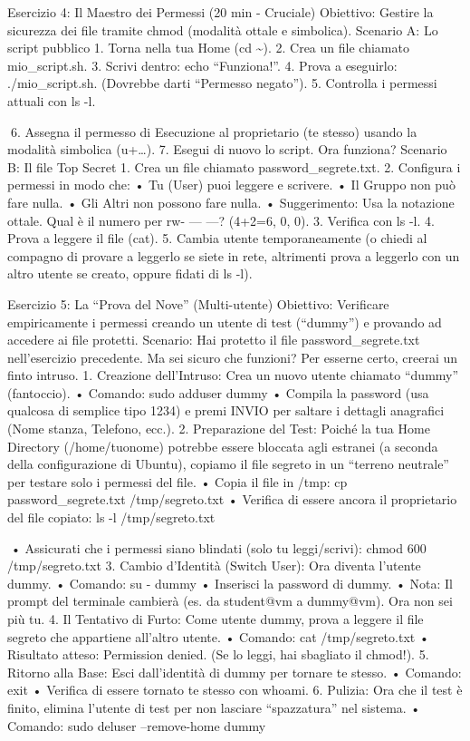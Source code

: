 \documentclass[11pt,a4paper]{article}
\begin{document}
Esercizio 4: Il Maestro dei Permessi (20 min - Cruciale) Obiettivo:
Gestire la sicurezza dei file tramite chmod (modalità ottale e
simbolica). Scenario A: Lo script pubblico 1. Torna nella tua Home (cd
\textasciitilde). 2. Crea un file chiamato mio\_script.sh. 3. Scrivi
dentro: echo ``Funziona!''. 4. Prova a eseguirlo: ./mio\_script.sh.
(Dovrebbe darti ``Permesso negato''). 5. Controlla i permessi attuali
con ls -l.

6. Assegna il permesso di Esecuzione al proprietario (te stesso) usando
la modalità simbolica (u+\ldots). 7. Esegui di nuovo lo script. Ora
funziona? Scenario B: Il file Top Secret 1. Crea un file chiamato
password\_segrete.txt. 2. Configura i permessi in modo che: • Tu (User)
puoi leggere e scrivere. • Il Gruppo non può fare nulla. • Gli Altri non
possono fare nulla. • Suggerimento: Usa la notazione ottale. Qual è il
numero per rw- --- ---? (4+2=6, 0, 0). 3. Verifica con ls -l. 4. Prova a
leggere il file (cat). 5. Cambia utente temporaneamente (o chiedi al
compagno di provare a leggerlo se siete in rete, altrimenti prova a
leggerlo con un altro utente se creato, oppure fidati di ls -l).

Esercizio 5: La ``Prova del Nove'' (Multi-utente) Obiettivo: Verificare
empiricamente i permessi creando un utente di test (``dummy'') e
provando ad accedere ai file protetti. Scenario: Hai protetto il file
password\_segrete.txt nell'esercizio precedente. Ma sei sicuro che
funzioni? Per esserne certo, creerai un finto intruso. 1. Creazione
dell'Intruso: Crea un nuovo utente chiamato ``dummy'' (fantoccio). •
Comando: sudo adduser dummy • Compila la password (usa qualcosa di
semplice tipo 1234) e premi INVIO per saltare i dettagli anagrafici
(Nome stanza, Telefono, ecc.). 2. Preparazione del Test: Poiché la tua
Home Directory (/home/tuonome) potrebbe essere bloccata agli estranei (a
seconda della configurazione di Ubuntu), copiamo il file segreto in un
``terreno neutrale'' per testare solo i permessi del file. • Copia il
file in /tmp: cp password\_segrete.txt /tmp/segreto.txt • Verifica di
essere ancora il proprietario del file copiato: ls -l /tmp/segreto.txt

• Assicurati che i permessi siano blindati (solo tu leggi/scrivi): chmod
600 /tmp/segreto.txt 3. Cambio d'Identità (Switch User): Ora diventa
l'utente dummy. • Comando: su - dummy • Inserisci la password di dummy.
• Nota: Il prompt del terminale cambierà (es. da student@vm a dummy@vm).
Ora non sei più tu. 4. Il Tentativo di Furto: Come utente dummy, prova a
leggere il file segreto che appartiene all'altro utente. • Comando: cat
/tmp/segreto.txt • Risultato atteso: Permission denied. (Se lo leggi,
hai sbagliato il chmod!). 5. Ritorno alla Base: Esci dall'identità di
dummy per tornare te stesso. • Comando: exit • Verifica di essere
tornato te stesso con whoami. 6. Pulizia: Ora che il test è finito,
elimina l'utente di test per non lasciare ``spazzatura'' nel sistema. •
Comando: sudo deluser --remove-home dummy
\end{document}
